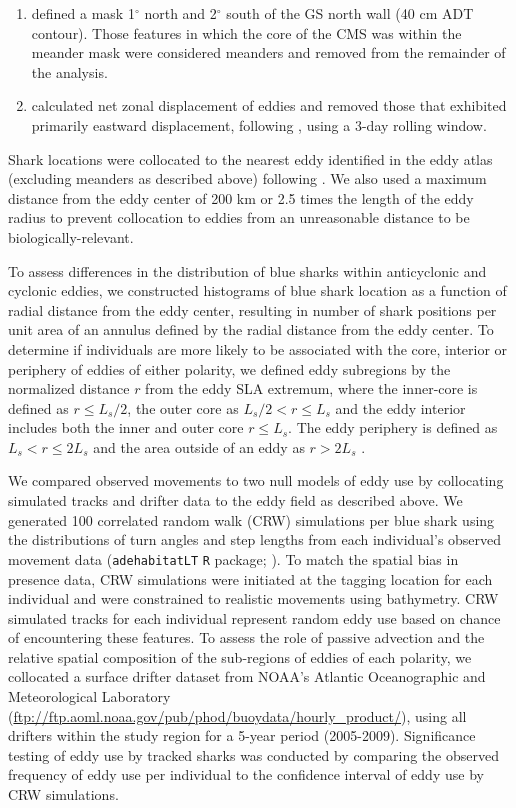\begin{enumerate} 
\item defined a mask 1$^\circ$ north and 2$^\circ$ south of the GS north wall (40 cm ADT contour). Those features in which the core of the CMS was within the meander mask were considered meanders and removed from the remainder of the analysis. 
\item calculated net zonal displacement of eddies and removed those that exhibited primarily eastward displacement, following \citet{Gaube2017DSR}, using a 3-day rolling window. 
\end{enumerate}

Shark locations were collocated to the nearest eddy identified in the eddy atlas (excluding meanders as described above) following \citet{Gaube2017}. We also used a maximum distance from the eddy center of 200 km or 2.5 times the length of the eddy radius to prevent collocation to eddies from an unreasonable distance to be biologically-relevant.

To assess differences in the distribution of blue sharks within anticyclonic and cyclonic eddies, we constructed histograms of blue shark location as a function of radial distance from the eddy center, resulting in number of shark positions per unit area of an annulus defined by the radial distance from the eddy center. To determine if individuals are more likely to be associated with the core, interior or periphery of eddies of either polarity, we defined eddy subregions by the normalized distance $r$ from the eddy SLA extremum, where the inner-core is defined as $r \leq L_s/2$, the outer core as $L_s/2 < r \leq L_s$ and the eddy interior includes both the inner and outer core $r \leq L_s$. The eddy periphery is defined as $L_s < r \leq 2L_s$ and the area outside of an eddy as $r > 2L_s$ \citep[see Fig. 2 in][]{Gaube2017}.

We compared observed movements to two null models of eddy use by collocating simulated tracks and drifter data to the eddy field as described above. We generated 100 correlated random walk (CRW) simulations per blue shark using the distributions of turn angles and step lengths from each individual's observed movement data (\texttt{adehabitatLT} \texttt{R} package; \citet{Calenge2006}). To match the spatial bias in presence data, CRW simulations were initiated at the tagging location for each individual and were constrained to realistic movements using bathymetry. CRW simulated tracks for each individual represent random eddy use based on chance of encountering these features. To assess the role of passive advection and the relative spatial composition of the sub-regions of eddies of each polarity, we collocated a surface drifter dataset from NOAA's Atlantic Oceanographic and Meteorological Laboratory (\url{ftp://ftp.aoml.noaa.gov/pub/phod/buoydata/hourly_product/}), using all drifters within the study region for a 5-year period (2005-2009). Significance testing of eddy use by tracked sharks was conducted by comparing the observed frequency of eddy use per individual to the confidence interval of eddy use by CRW simulations.

